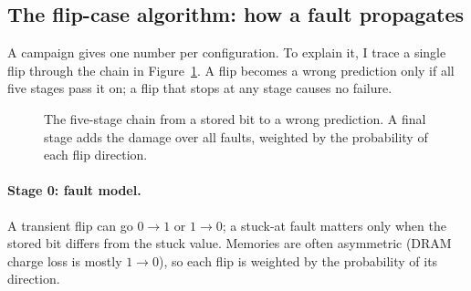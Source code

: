 \documentclass[12pt,a4paper]{article}
\begin{document}
\subsection{The flip-case algorithm: how a fault propagates}
\label{sec:cases}

A campaign gives one number per configuration. To explain it, I trace a single flip through
the chain in Figure~\ref{fig:chain}. A flip becomes a wrong prediction only if all five stages
pass it on; a flip that stops at any stage causes no failure.

\begin{figure}[H]
\centering
{}
\caption{The five-stage chain from a stored bit to a wrong prediction. A final stage adds the
damage over all faults, weighted by the probability of each flip direction.}
\label{fig:chain}
\end{figure}

\paragraph{Stage 0: fault model.} A transient flip can go $0\to1$ or $1\to0$; a stuck-at fault
matters only when the stored bit differs from the stuck value. Memories are often asymmetric
(DRAM charge loss is mostly $1\to0$), so each flip is weighted by the probability of its
direction.
\end{document}
